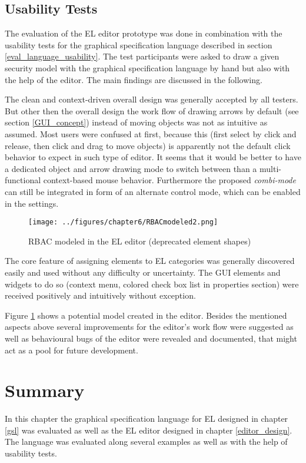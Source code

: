 \documentclass[twoside, openright, 12pt]{book}
\begin{document}
\subsection{Usability Tests}
\label{eval_editor_usability}
The evaluation of the EL editor prototype was done in combination with the usability tests for the graphical specification language described in section \ref{eval_language_usability}.
The test participants were asked to draw a given security model with the graphical specification language by hand but also with the help of the editor.
The main findings are discussed in the following.

The clean and context-driven overall design was generally accepted by all testers. 
But other then the overall design the work flow of drawing arrows by default (see section \ref{GUI_concept}) instead of moving objects was not as intuitive as assumed.
Most users were confused at first, because this (first select by click and release, then click and drag to move objects) is apparently not the default click behavior to expect in such type of editor.
It seems that it would be better to have a dedicated object and arrow drawing mode to switch between than a multi-functional context-based mouse behavior.
Furthermore the proposed \textit{combi-mode} can still be integrated in form of an alternate control mode, which can be enabled in the settings.

\begin{figure}[bht]
	\centering
	\texttt{[image: ../figures/chapter6/RBACmodeled2.png]}
	\caption{RBAC modeled in the EL editor (deprecated element shapes)}
	\label{fig:RBACmodeled2}
\end{figure}

The core feature of assigning elements to EL categories was generally discovered easily and used without any difficulty or uncertainty.
The GUI elements and widgets to do so (context menu, colored check box list in properties section) were received positively and intuitively without exception.

Figure \ref{fig:RBACmodeled2} shows a potential model created in the editor.
Besides the mentioned aspects above several improvements for the editor's work flow were suggested as well as behavioural bugs of the editor were revealed and documented, that might act as a pool for future development.



\section{Summary}
\label{eval_summary}
In this chapter the graphical specification language for EL designed in chapter \ref{gsl} was evaluated as well as the EL editor designed in chapter \ref{editor_design}.
The language was evaluated along several examples as well as with the help of usability tests.
\end{document}
